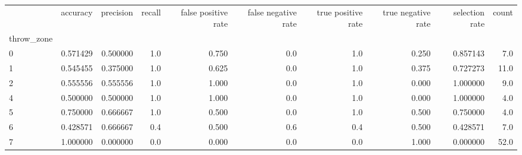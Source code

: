\begin{tabular}{lrrrrrrrrr}
\toprule
{} &  accuracy &  precision &  recall &  false positive rate &  false negative rate &  true positive rate &  true negative rate &  selection rate &  count \\
throw\_zone &           &            &         &                      &                      &                     &                     &                 &        \\
\midrule
0          &  0.571429 &   0.500000 &     1.0 &                0.750 &                  0.0 &                 1.0 &               0.250 &        0.857143 &    7.0 \\
1          &  0.545455 &   0.375000 &     1.0 &                0.625 &                  0.0 &                 1.0 &               0.375 &        0.727273 &   11.0 \\
2          &  0.555556 &   0.555556 &     1.0 &                1.000 &                  0.0 &                 1.0 &               0.000 &        1.000000 &    9.0 \\
4          &  0.500000 &   0.500000 &     1.0 &                1.000 &                  0.0 &                 1.0 &               0.000 &        1.000000 &    4.0 \\
5          &  0.750000 &   0.666667 &     1.0 &                0.500 &                  0.0 &                 1.0 &               0.500 &        0.750000 &    4.0 \\
6          &  0.428571 &   0.666667 &     0.4 &                0.500 &                  0.6 &                 0.4 &               0.500 &        0.428571 &    7.0 \\
7          &  1.000000 &   0.000000 &     0.0 &                0.000 &                  0.0 &                 0.0 &               1.000 &        0.000000 &   52.0 \\
\bottomrule
\end{tabular}

